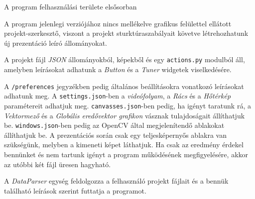 

A program felhasználási területe elsősorban 

A program jelenlegi verziójához nincs mellékelve grafikus felülettel ellátott projekt-szerkesztő, viszont a projekt sturktúraszabályait követve létrehozhatunk új prezentáció leíró állományokat.

\bigskip


\bigskip

\noindent A projekt fájl \textit{JSON} állományokból, képekből és egy \texttt{actions.py} modulból áll, amelyben leírásokat adhatunk a \textit{Button} és a \textit{Tuner} widgetek viselkedésére.

A \texttt{/preferences} jegyzékben pedig általános beállításokra vonatkozó leírásokat adhatunk meg. A \texttt{settings.json}-ben a \textit{videófolyam}, a \textit{Rács} és a \textit{Hőtérkép} paramétereit adhatjuk meg.
\texttt{canvasses.json}-ben pedig, ha igényt taratunk rá, a \textit{Vektormező} és a \textit{Globális eredővektor grafikon} vásznak tulajdoságait állíthatjuk be.
\texttt{windows.json}-ben pedig az OpenCV által megjelenítendő ablakokat állíthatjuk be. A prezentációs során csak egy teljesképernyős ablakra van szükségünk, melyben a kimeneti képet láthatjuk. Ha csak az eredmény érdekel bennünket és nem tartunk igényt a program működésének megfigyelésére, akkor az utóbbi két fájl üresen hagyható.

A \textit{DataParser} egység feldolgozza a felhasználó projekt fájlait és a bennük található leírások szerint futtatja a programot.


